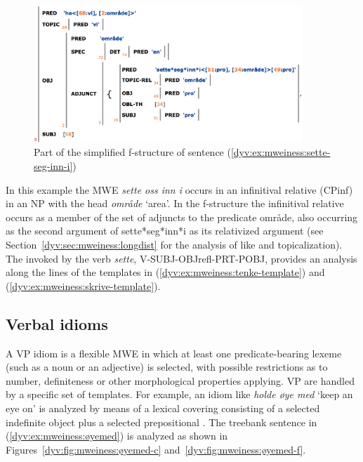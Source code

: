 \documentclass[output=paper]{langsci/langscibook}
\begin{document}
\begin{figure}
  \includegraphics[width=0.9\textwidth]{figures/sette-seg-inn-i-f.png}
  \caption{Part of the simplified f-structure of sentence (\ref{dyv:ex:mweiness:sette-seg-inn-i})}
  \label{dyv:fig:mweiness:sette-seg-inn-i-f}
\end{figure}

In this example the MWE  \textit{sette oss inn i} occurs in an infinitival relative (\textsf{CPinf}) in an \textsf{NP} with the head \textit{område} `area'.
In the f-structure the infinitival relative occurs as a member of the set of adjuncts to the predicate \textsf{område}, also occurring as the second argument of \textsf{sette*seg*inn*i} as its relativized argument (see Section~\ref{dyv:sec:mweiness:longdist} for the analysis of  like  and topicalization).
The  invoked by the verb \textit{sette}, \textsf{V-SUBJ-OBJrefl-PRT-POBJ}, provides an analysis along the lines of the templates in (\ref{dyv:ex:mweiness:tenke-template}) and (\ref{dyv:ex:mweiness:skrive-template}).

\subsection{Verbal idioms}\label{dyv:sec:mweiness:verbalidioms}

A VP idiom is a flexible MWE in which at least one predicate-bearing lexeme (such as a noun or an adjective) is selected, with possible restrictions as to number, definiteness or other morphological properties applying.
VP  are handled by a specific set of templates.
For example, an idiom like \textit{holde øye med} `keep an eye on' is analyzed by means of a lexical  covering  consisting of a selected indefinite object plus a selected prepositional .
The treebank sentence in (\ref{dyv:ex:mweiness:øyemed}) is analyzed as shown in Figures~\ref{dyv:fig:mweiness:øyemed-c} and~\ref{dyv:fig:mweiness:øyemed-f}.
\end{document}

